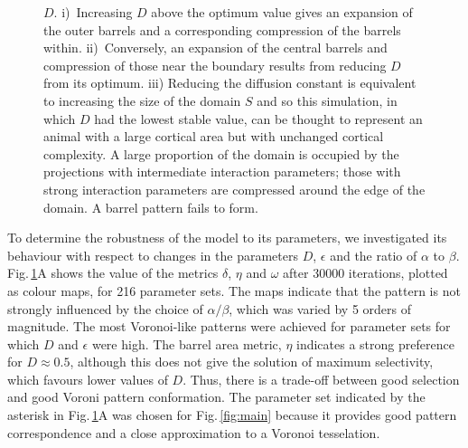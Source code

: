\documentclass[9pt,lineno]{elife}
\newcommand{\paramsearch}[1]{\textcolor{revbblack}{#1}}
\begin{document}
\begin{figure}
\begin{fullwidth}
{{        $D$. i)~Increasing $D$ above the optimum value gives an expansion of
        the outer barrels and a corresponding compression of the barrels
        within. ii)~Conversely, an expansion of the central barrels and
        compression of those near the boundary results from reducing $D$ from
        its optimum. iii) Reducing the diffusion constant is equivalent to
        increasing the size of the domain $S$ and so this simulation, in which
        $D$ had the lowest stable value, can be thought to represent an animal
        with a large cortical area but with unchanged cortical complexity. A
        large proportion of the domain is occupied by the projections with
        intermediate interaction parameters; those with strong interaction
        parameters are compressed around the edge of the domain. A barrel
        pattern fails to form.}}
    \label{fig:paramsweep}
  \end{fullwidth}
\end{figure}

\paramsearch{To determine the robustness of the model to its parameters, we
  investigated its behaviour with respect to changes in the parameters $D$,
  $\epsilon$ and the ratio of $\alpha$ to $\beta$. Fig.\,\ref{fig:paramsweep}A
  shows the value of the metrics $\delta$, $\eta$ and $\omega$ after 30000
  iterations, plotted as colour maps, for 216 parameter sets. The maps
  indicate that the pattern is not strongly influenced by the choice of
  $\alpha/\beta$, which was varied by 5 orders of magnitude. The most
  Voronoi-like patterns were achieved for parameter sets for which $D$ and
  $\epsilon$ were high. The barrel area metric, $\eta$ indicates a strong
  preference for $D\approx0.5$, although this does not give the solution of
  maximum selectivity, which favours lower values of $D$. Thus, there is a
  trade-off between good selection and good Voroni pattern conformation.  The
  parameter set indicated by the asterisk in Fig.\,\ref{fig:paramsweep}A was
  chosen for Fig.\,\ref{fig:main} because it provides good pattern
  correspondence and a close approximation to a Voronoi tesselation.}
\end{document}
